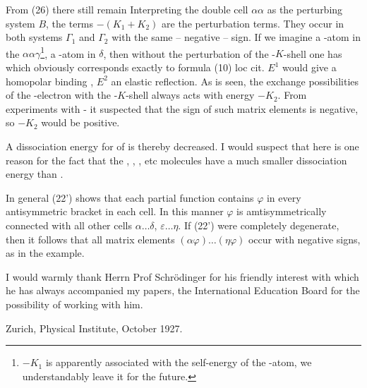 \begin{paper}{1}
From (26) there still remain
Interpreting the double cell $\alpha\alpha$ as the perturbing system $B$, the terms $-(K_1 + K_2)$ are the perturbation terms. They occur in both systems $\Gamma_1$ and $\Gamma_2$ with the same -- negative -- sign. If we imagine a -atom in the $\alpha\alpha\gamma$\footnote{$-K_1$ is apparently associated with the self-energy of the -atom, we understandably leave it for the future.}, a -atom in $\delta$, then without the perturbation of the -$K$-shell one has
which obviously corresponds exactly to formula (10) loc cit. $E^1$ would give a homopolar binding , $E^2$ an elastic reflection. As is seen, the exchange possibilities of the -electron with the -$K$-shell always acts with energy $-K_2$. From experiments with - it suspected that the sign of such matrix elements is negative, so $-K_2$ would be positive.

A dissociation energy for  of
is thereby decreased. I would suspect that here is one reason for the fact that the , , , etc molecules have a much smaller dissociation energy than .

In general (22') shows that each partial function contains $\varphi$ in every antisymmetric bracket in each cell. In this manner $\varphi$ is amtisymmetrically connected with all other cells $\alpha\dots\delta$, $\varepsilon\dots\eta$. If (22') were completely degenerate, then it follows that all matrix elements $(\alpha\varphi)\dots(\eta\varphi)$ occur with negative signs, as in the example.

I would warmly thank Herrn Prof Schr\"odinger for his friendly interest with which he has always accompanied my papers, the International Education Board for the possibility of working with him.

Zurich, Physical Institute, October 1927.
\end{paper}